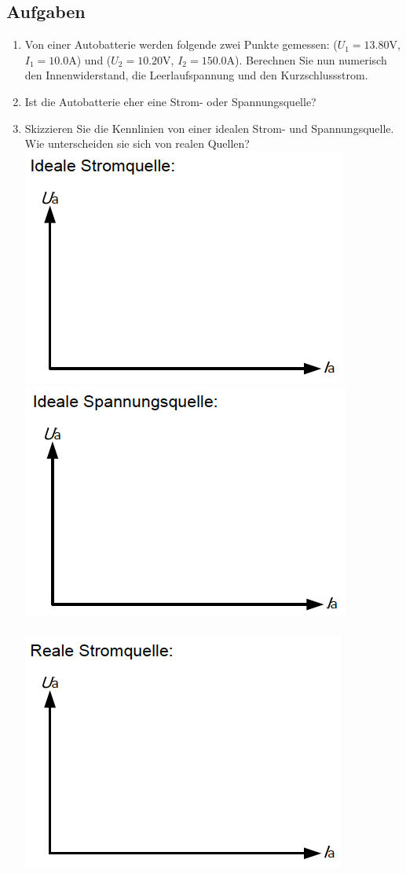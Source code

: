 \subsection{Aufgaben}
\begin{enumerate}[$a)$]
\item Von einer Autobatterie werden folgende zwei Punkte gemessen: ($U_1=13.80\text{V}$, $I_1=10.0\text{A}$) und ($U_2=10.20\text{V}$, $I_2=150.0\text{A}$).
Berechnen Sie nun numerisch den Innenwiderstand, die Leerlaufspannung und den
Kurzschlussstrom.
\item Ist die Autobatterie eher eine Strom- oder Spannungsquelle?
\item Skizzieren Sie die Kennlinien von einer idealen Strom- und Spannungsquelle. Wie unterscheiden sie sich von realen Quellen?
\includegraphics[scale=0.5]{../img/III/IIIa}
\includegraphics[scale=0.5]{../img/III/IIIb}
\\\\
\includegraphics[scale=0.5]{../img/III/IIIc}

\end{enumerate}
